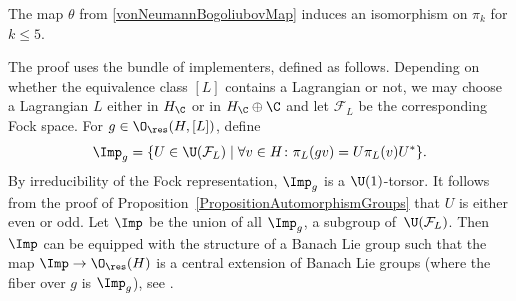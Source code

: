 \begin{Theorem} \label{TheoremIsoPileq2}
The map $\theta$ from \eqref{vonNeumannBogoliubovMap} induces an isomorphism on $\pi_k$ for $k \leq 5$.
\end{Theorem}

The proof uses the bundle of implementers, defined as follows.
Depending on whether the equivalence class $[L]$ contains a Lagrangian or not, we may choose a Lagrangian $L$ either in $H_\C$ or in $H_\C \oplus \C$ and let $\mathcal{F}_L$ be the corresponding Fock space.
For $g \in \O_{\res}(H, [L])$, define
\begin{equation*}
 \Imp_g = \{ U \in \U(\mathcal{F}_L) \mid \forall v \in H\colon \pi_L (g v) = U \pi_L(v) U^*\}.
\end{equation*}
By irreducibility of the Fock representation, $\Imp_g$ is a $\U(1)$-torsor.
It follows from the proof of Proposition~\ref{PropositionAutomorphismGroups} that $U$ is either even or odd.
Let $\Imp$ be the union of all $\Imp_g$, a subgroup of~$\U(\mathcal{F}_L)$.
Then $\Imp$ can be equipped with the structure of a Banach Lie group such that the map $\Imp \to \O_{\res}(H)$ is a central extension of Banach Lie groups (where the fiber over $g$ is $\Imp_g$), see \cite[Section~3.5]{KristelWaldorf1}.



